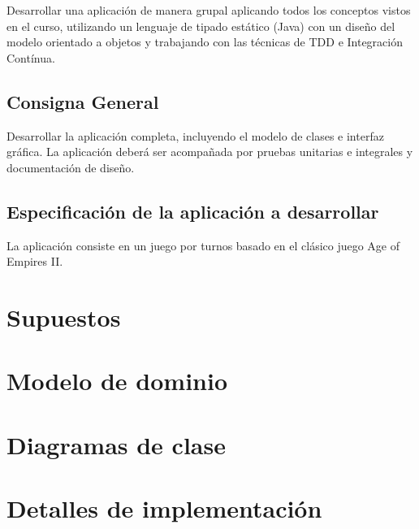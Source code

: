 \documentclass[titlepage,a4paper]{article}
\begin{document}
Desarrollar una aplicación de manera grupal aplicando todos los conceptos vistos en el curso, utilizando un lenguaje de tipado estático (Java) con un diseño del modelo orientado a objetos y trabajando con las técnicas de TDD e Integración Contínua.


\subsection{Consigna General}

Desarrollar la aplicación completa, incluyendo el modelo de clases e interfaz gráfica. La aplicación deberá ser acompañada por pruebas unitarias e integrales y documentación de diseño.

\subsection{Especificación de la aplicación a desarrollar}

La aplicación consiste en un juego por turnos basado en el clásico juego Age of Empires II.

\section{Supuestos}\label{sec:supuestos}



\section{Modelo de dominio}\label{sec:modelo}


\section{Diagramas de clase}\label{sec:diagramasdeclase}


\section{Detalles de implementación}\label{sec:implementacion}
\end{document}

